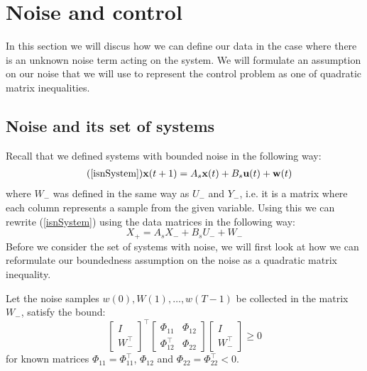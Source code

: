 \section{Noise and control} \label{sectionNoise}
In this section we will discus how we can define our data in the case where there is an unknown noise term acting on the system. We will formulate an assumption on our noise that we will use to represent the control problem as one of quadratic matrix inequalities. 

\subsection{Noise and its set of systems}
Recall that we defined systems with bounded noise in the following way:
\begin{align} \tag{\ref{isnSystem}}
\mathbf{x}(t+1) &= A_s \mathbf{x}(t) + B_s \mathbf{u}(t) + \mathbf{w}(t)
\end{align}
where $W_-$ was defined in the same way as $U_-$ and $Y_-$, i.e. it is a matrix where each column represents a sample from the given variable. Using this we can rewrite (\ref{isnSystem}) using the data matrices in the following way:
\begin{equation} \label{isnSystemData}
	X_+ = A_s X_- + B_s U_- + W_-
\end{equation}
Before we consider the set of systems with noise, we will first look at how we can reformulate our boundedness assumption on the noise as a quadratic matrix inequality.

\cite[Assumption 1]{waarde2020noisy}
Let the noise samples $w(0),W(1),\dots,w(T-1)$ be collected in the matrix $W_-$, satisfy the bound:
\begin{equation} \label{noiseBound}
	\begin{bmatrix} I \\ W_-^\top \end{bmatrix} ^\top
	\begin{bmatrix} \Phi_{11} & \Phi_{12} \\ \Phi_{12}^\top & \Phi_{22} \end{bmatrix}
	\begin{bmatrix} I \\ W_-^\top \end{bmatrix} \geq 0
\end{equation}
for known matrices $\Phi_{11} = \Phi_{11}^\top$, $\Phi_{12}$ and $\Phi_{22} = \Phi_{22}^\top < 0$.

